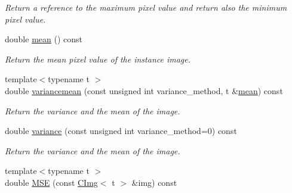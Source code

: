 \begin{DoxyCompactItemize}
\begin{DoxyCompactList}\small\item\em Return a reference to the maximum pixel value and return also the minimum pixel value. \end{DoxyCompactList}\item 
\hypertarget{structcimg__library_1_1_c_img_a4b21deea16cfe834ecbb6f33d1f0b834}{double \hyperlink{structcimg__library_1_1_c_img_a4b21deea16cfe834ecbb6f33d1f0b834}{mean} () const }\label{structcimg__library_1_1_c_img_a4b21deea16cfe834ecbb6f33d1f0b834}

\begin{DoxyCompactList}\small\item\em Return the mean pixel value of the instance image. \end{DoxyCompactList}\item 
\hypertarget{structcimg__library_1_1_c_img_a6eb50cd5f32362686d0da16480eab072}{{\footnotesize template$<$typename t $>$ }\\double \hyperlink{structcimg__library_1_1_c_img_a6eb50cd5f32362686d0da16480eab072}{variancemean} (const unsigned int variance\-\_\-method, t \&\hyperlink{structcimg__library_1_1_c_img_a4b21deea16cfe834ecbb6f33d1f0b834}{mean}) const }\label{structcimg__library_1_1_c_img_a6eb50cd5f32362686d0da16480eab072}

\begin{DoxyCompactList}\small\item\em Return the variance and the mean of the image. \end{DoxyCompactList}\item 
\hypertarget{structcimg__library_1_1_c_img_ad504e1461f9bf66a0d98015955320dc8}{double \hyperlink{structcimg__library_1_1_c_img_ad504e1461f9bf66a0d98015955320dc8}{variance} (const unsigned int variance\-\_\-method=0) const }\label{structcimg__library_1_1_c_img_ad504e1461f9bf66a0d98015955320dc8}

\begin{DoxyCompactList}\small\item\em Return the variance and the mean of the image. \end{DoxyCompactList}\item 
\hypertarget{structcimg__library_1_1_c_img_a99daaee875f1a69bc2efebcf21c7cd2b}{{\footnotesize template$<$typename t $>$ }\\double \hyperlink{structcimg__library_1_1_c_img_a99daaee875f1a69bc2efebcf21c7cd2b}{M\-S\-E} (const \hyperlink{structcimg__library_1_1_c_img}{C\-Img}$<$ t $>$ \&img) const }\label{structcimg__library_1_1_c_img_a99daaee875f1a69bc2efebcf21c7cd2b}


\end{DoxyCompactItemize}
